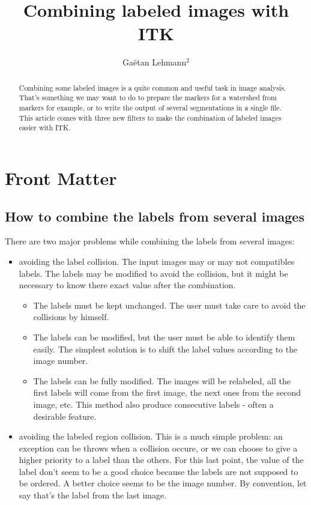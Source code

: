 \documentclass{InsightArticle}
\title{Combining labeled images with ITK}
\author{Ga\"etan Lehmann{$^2$}}
\begin{document}
\maketitle

\ifhtml
\chapter*{Front Matter\label{front}}
\fi


\begin{abstract}
\noindent
Combining some labeled images is a quite common and useful task in image analysis.
That's something we may want to do to prepare the markers for a watershed from
markers for example, or to write the output of several segmentations in a single
file.
This article comes with three new filters to make the combination
of labeled images easier with ITK.
\end{abstract}

\section{How to combine the labels from several images}

There are two major problems while combining the labels from several images:
\begin{itemize}
  \item avoiding the label collision. The input images may or may not compatibles labels.
  The labels may be modified to avoid the collision, but it might be necessary to know
  there exact value after the combination.
  \begin{itemize}
    \item The labels must be kept unchanged. The user must take care to avoid the collisions
    by himself.
    \item The labels can be modified, but the user must be able to identify them easily. The
    simplest solution is to shift the label values according to the image number.
    \item The labels can be fully modified. The images will be relabeled, all the first labels
    will come from the first image, the next ones from the second image, etc. This method also
    produce consecutive labels - often a desirable feature.
  \end{itemize}

  \item avoiding the labeled region collision. This is a much simple problem: an exception
  can be throws when a collision occure, or we can choose to give a higher priority to a
  label than the others. For this last point, the value of the label don't seem to be a good choice
  because the labels are not supposed to be ordered. A better choice seems to be the image
  number. By convention, let say that's the label from the last image.
  
\end{itemize}
\end{document}
